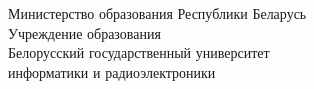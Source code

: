\begin{titlepage}
  \begin{center}
    Министерство образования Республики Беларусь\\
    Учреждение образования\\
    Белорусский государственный университет\\ информатики и радиоэлектроники\\[2em]




\end{center}
\end{titlepage}

